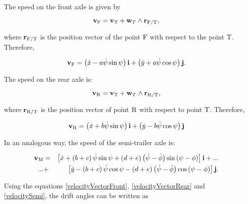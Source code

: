 \documentclass[sublist]{fei}
\begin{document}
The speed on the front axle is given by

\begin{equation}
    {\bf v}_{\rm F} = {\bf v}_{\rm T} + {\bf w}_T \wedge {\bf r}_{{\rm F}/{\rm T}},
\end{equation}

where \({\bf r}_{{\rm F}/{\rm T}}\) is the position vector of the point \({\rm F}\) with respect to the point \({\rm T}\). Therefore,

\begin{equation} \label{velocityVectorFront}
    {\bf v}_{\rm F} = \left( \dot{x} - a \dot{\psi} \sin \psi \right) {\bf i} + \left( \dot{y} + a \dot{\psi} \cos \psi \right) {\bf j}.
\end{equation}

The speed on the rear axle is:

\begin{equation}
    {\bf v}_{\rm R} = {\bf v}_{\rm T} + {\bf w}_T \wedge {\bf r}_{{\rm R}/{\rm T}},
\end{equation}

where \({\bf r}_{{\rm R}/{\rm T}}\) is the position vector of point \({\rm R}\) with respect to point \({\rm T}\). Therefore,

\begin{equation} \label{velocityVectorRear}
    {\bf v}_{\rm R} = \left( \dot{x} + b \dot{\psi} \sin \psi \right) {\bf i} + \left( \dot{y} -b \dot{\psi} \cos \psi \right) {\bf j}
\end{equation}

In an analogous way, the speed of the semi-trailer axle is:

\begin{eqnarray} \label{velocitySemi}
    \nonumber
    {\bf v}_{\rm M} &=& \left[ \dot{x} + \left( b + c \right) \dot{\psi} \sin \psi + \left( d + e \right) \left( \dot{\psi} - \dot{\phi} \right) \sin \left( \psi - \phi \right) \right] {\bf i} + ... \\
    \nonumber
    ... &+& \left[ \dot{y} - \left( b + c \right) \dot{\psi} \cos \psi - \left( d + e \right) \left( \dot{\psi} - \dot{\phi} \right) \cos \left( \psi - \phi \right) \right] {\bf j}. \\
\end{eqnarray}


Using the equations \eqref{velocityVectorFront}, \eqref{velocityVectorRear} and \eqref{velocitySemi}, the drift angles can be written as
\end{document}
